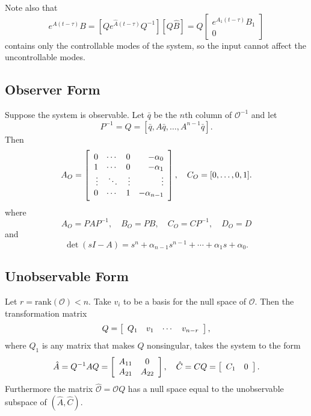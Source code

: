 \documentclass{article}
\begin{document}
Note also that
$$
e^{A(t - \tau)} B
= [ Q e^{\hat{A}(t - \tau)} Q^{-1} ]
  [ Q \hat{B} ]
= Q\left[\begin{array}{c}
     e^{A_1 (t - \tau)} B_1 \\
     0
   \end{array}\right]
$$
contains only the controllable modes of the system, so the input
cannot affect the uncontrollable modes.

\subsection{Observer Form}
Suppose the system is observable.
Let $\bar{q}$ be the $n$th column of $\mathcal{O}^{-1}$ and let
$$
P^{-1} = Q = [\bar{q}, A \bar{q}, \dots, A^{n-1} \bar{q}].
$$
Then
$$
A_O =
\left[\begin{array}{r r r r}
  0      & \cdots & 0      & -\alpha_0 \\
  1      & \cdots & 0      & -\alpha_1 \\
  \vdots & \ddots & \vdots & \vdots    \\
  0      & \cdots & 1      & -\alpha_{n-1}
\end{array}\right], \quad
C_O = [0, \dots, 0, 1].
$$
where
$$
A_O = P A P^{-1}, \quad
B_O = P B, \quad
C_O = C P^{-1}, \quad
D_O = D
$$
and
$$
\det (sI - A) = s^n + \alpha_{n-1} s^{n-1} + \cdots + \alpha_1 s + \alpha_0.
$$

\subsection{Unobservable Form}
Let $r = \mathrm{rank}(\mathcal{O}) < n$. Take
$v_i$ to be a basis for the null space of $\mathcal{O}$. Then the
transformation matrix
$$
Q =
\left[\begin{array}{c c c c }
  Q_1 & v_1 & \cdots & v_{n-r}
\end{array}\right],
$$
where $Q_1$ is any matrix that makes $Q$ nonsingular, takes the system
to the form
$$
\hat{A} = Q^{-1} A Q =
\left[\begin{array}{c c}
  A_{11} & 0      \\
  A_{21} & A_{22}
\end{array}\right], \quad
\hat{C} = C Q =
\left[\begin{array}{c c}
  C_1 & 0
\end{array}\right].
$$
Furthermore the matrix $\hat{\mathcal{O}} = \mathcal{O} Q$ has a null
space equal to the unobservable subspace of $(\hat{A}, \hat{C})$.
\end{document}
